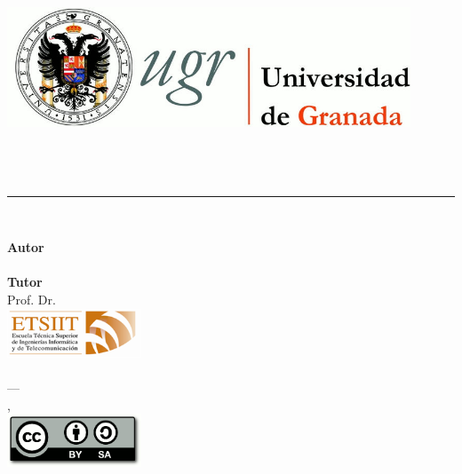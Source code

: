 \begin{titlepage}
 
\newlength{\centeroffset}
\setlength{\centeroffset}{-0.5\oddsidemargin}
\addtolength{\centeroffset}{0.5\evensidemargin}

\noindent\hspace*{\centeroffset}\begin{minipage}{\textwidth}

\centering
\includegraphics[width=0.9\textwidth]{../images/logo_ugr.jpg}\\[1.4cm]

\textsc{\Large\mySubject\\[0.2cm]}
\textsc{\myDegree}\\[1cm]

{\Huge\bfseries \myTitle\\}
\noindent\rule[-1ex]{\textwidth}{3pt}\\[3.5ex]
{\large\bfseries \mySubTitle}
\end{minipage}

\vspace{1.7cm}
\noindent\hspace*{\centeroffset}\begin{minipage}{\textwidth}
\centering

\textbf{Autor}\\ {\myName}\\[2.5ex]
\textbf{Tutor}\\ {Prof. Dr. \myProf}\\[2cm]
\includegraphics[width=0.3\textwidth]{../images/etsiit_logo.png}\\[0.1cm]
\textsc{\myFaculty}\\
\textsc{---}\\
\myLocation, \myTime\\
\includegraphics[width=0.3\textwidth]{../images/CC-SA-logo.png}
\end{minipage}
\end{titlepage}


